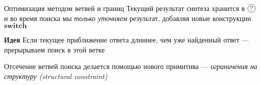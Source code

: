 \documentclass[aspectratio=169
  , xcolor={svgnames}
  , hyperref={ colorlinks,citecolor=Blue
             , linkcolor=DarkRed,urlcolor=DarkBlue}
  , russian
  ]{beamer}
\newcommand{\primi}[1]{\ensuremath{\mathbf{#1}}}
\newcommand*\circled[1]{\tikz[baseline=(char.base)]{
    \node[shape=circle,draw,inner sep=1pt] (char) {#1};}}
\begin{document}
\begin{comment}
Мы можем во время компиляции обнаружить, что
\begin{itemize}
\item Всего $2^3$ жителей у типа \lstinline=bool * bool * bool=
\item Не надо проверять, что сопоставляемое выражение --- это тройка
\item Не надо заглядывать в 1ю и 2ю компоненты, так как важна только третья 
\end{itemize}
\vspace{1em}


Итого, может запускать синтез только на двух примерах $\{(\mathcal{B},\mathcal{B},\text{T}),(\mathcal{B},\mathcal{B},\text{F})\}$
(где $\mathcal{B}$ ---~это любое значение типа \lstinline=bool=)
если мы \textbf{запретим "заглядывание" в ненужные поддеревья} примеров
\end{frame}
\end{comment}

\begin{frame}{Оптимизация методом ветвей и границ}
Текущий результат синтеза хранится в  $\circled{?}$ и во время поиска 
мы \emph{только уточняем} результат, добавляя новые конструкции $\primi{switch}$ \\

\begin{alertblock}{\textbf{Идея}}
Если текущее приближение ответа длиннее, чем уже найденный ответ --- прерырываем поиск в этой ветке
\end{alertblock}
\vspace{2em}


Отсечение ветвей поиска делается помощью нового примитива --- \emph{ограничения на структуру (structural constraint)}

\end{frame}









%
%
%
%
\end{document}
